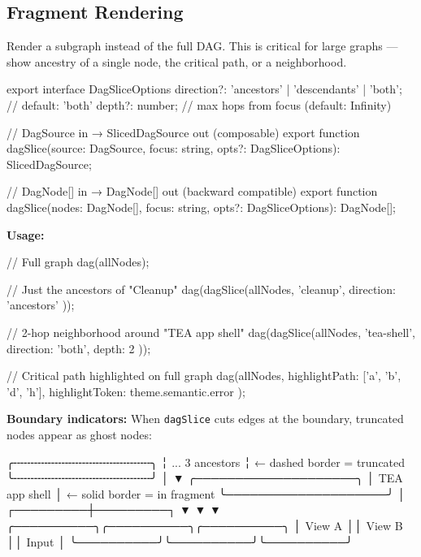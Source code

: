 \subsection{Fragment Rendering}\label{record-426-fragment-rendering}

Render a subgraph instead of the full DAG. This is critical for large graphs --- show ancestry of a single node, the critical path, or a neighborhood.

\begin{CodeBlock}
export interface DagSliceOptions {
  direction?: 'ancestors' | 'descendants' | 'both';  // default: 'both'
  depth?: number;                                      // max hops from focus (default: Infinity)
}

// DagSource in → SlicedDagSource out (composable)
export function dagSlice(source: DagSource, focus: string, opts?: DagSliceOptions): SlicedDagSource;

// DagNode[] in → DagNode[] out (backward compatible)
export function dagSlice(nodes: DagNode[], focus: string, opts?: DagSliceOptions): DagNode[];
\end{CodeBlock}

\textbf{Usage:}

\begin{CodeBlock}
// Full graph
dag(allNodes);

// Just the ancestors of "Cleanup"
dag(dagSlice(allNodes, 'cleanup', { direction: 'ancestors' }));

// 2-hop neighborhood around "TEA app shell"
dag(dagSlice(allNodes, 'tea-shell', { direction: 'both', depth: 2 }));

// Critical path highlighted on full graph
dag(allNodes, { highlightPath: ['a', 'b', 'd', 'h'], highlightToken: theme.semantic.error });
\end{CodeBlock}

\textbf{Boundary indicators:} When \texttt{d\allowbreak{}a\allowbreak{}g\allowbreak{}S\allowbreak{}l\allowbreak{}i\allowbreak{}c\allowbreak{}e} cuts edges at the boundary, truncated nodes appear as ghost nodes:

\begin{CodeBlock}
          ╭╌╌╌╌╌╌╌╌╌╌╌╌╌╌╌╌╌╌╌╌╮
          ╎ ... 3 ancestors      ╎    ← dashed border = truncated
          ╰╌╌╌╌╌╌╌╌╌╌╌╌╌╌╌╌╌╌╌╌╯
                    │
                    ▼
          ╭────────────────────╮
          │ TEA app shell      │     ← solid border = in fragment
          ╰────────────────────╯
                    │
          ┌─────────┼─────────┐
          ▼         ▼         ▼
  ╭──────────╮╭──────────╮╭──────────╮
  │ View A   ││ View B   ││ Input    │
  ╰──────────╯╰──────────╯╰──────────╯
\end{CodeBlock}

